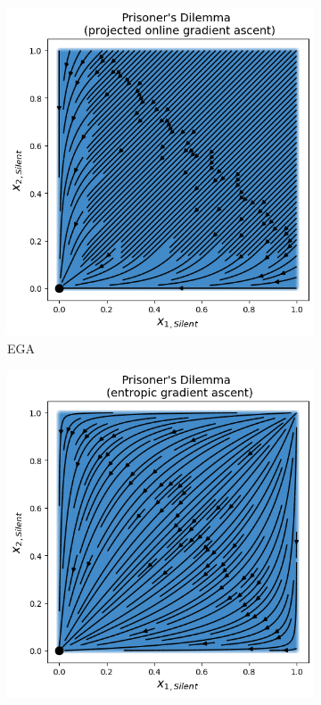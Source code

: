 \begin{figure}[H]
\captionsetup{justification=centering}
\centering
\begin{subfigure}{.5\textwidth}
    \centering
    \includegraphics[width=\textwidth]{logos/Prisoner2.png}
    \caption{EGA}
\end{subfigure}%
\begin{subfigure}{.5\textwidth}
    \centering
    \includegraphics[width=\textwidth]{logos/Prisoner3.png}

\end{subfigure}
\end{figure}
